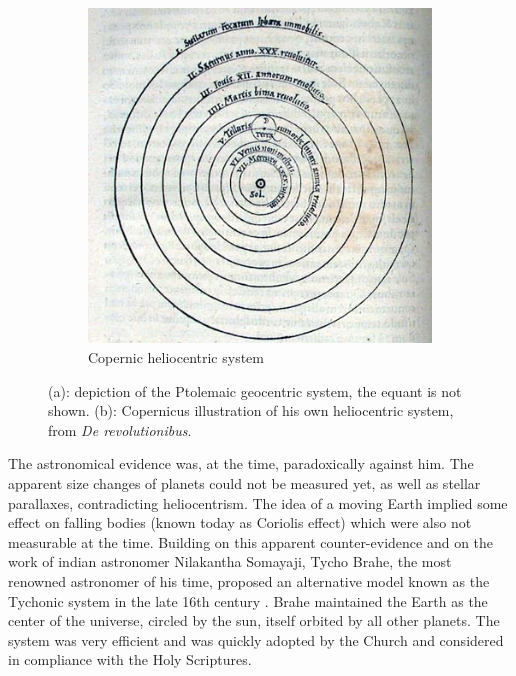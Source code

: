 \begin{figure}
\begin{subfigure}[b]{0.48\textwidth}
    	\includegraphics[width=\linewidth]{Figures/0_CopernicusModel.jpg}
        \caption{Copernic heliocentric system}
        \label{Fig:0_copernicsystem}
    \end{subfigure}
\caption{(a): depiction of the Ptolemaic geocentric system, the equant is not shown. (b): Copernicus illustration of his own heliocentric system, from \textit{De revolutionibus}.}
\label{Fig:0_heliogeo}
\end{figure}



The astronomical evidence was, at the time, paradoxically against him. The apparent size changes of planets could not be measured yet, as well as stellar parallaxes, contradicting heliocentrism. The idea of a moving Earth implied some effect on falling bodies (known today as Coriolis effect) which were also not measurable at the time. Building on this apparent counter-evidence and on the work of indian astronomer Nilakantha Somayaji, Tycho Brahe, the most renowned astronomer of his time, proposed an alternative model known as the Tychonic system in the late 16th century \citep{ramasubramanian1998}. Brahe maintained the Earth as the center of the universe, circled by the sun, itself orbited by all other planets. The system was very efficient and was quickly adopted by the Church and considered in compliance with the Holy Scriptures.

